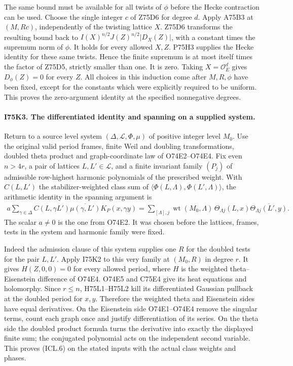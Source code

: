 The same bound must be available for all twists of $\phi$ before
the Hecke contraction can be used. Choose the single integer $c$
of Z75D6 for degree $d$. Apply A75B3 at $(M,Rc)$, independently
of the twisting lattice $X$. Z75D6 transforms the resulting bound
back to $I(X)^{n/2}J(Z)^{n/2}|D_X(Z)|$, with a constant times
the supremum norm of $\phi$. It holds for every allowed $X,Z$.
P75H3 supplies the Hecke identity for these same twists. Hence the
finite supremum is at most itself times the factor of Z75D5,
strictly smaller than one. It is zero. Taking $X=\mathcal O_E^d$
gives $D_\phi(Z)=0$ for every $Z$. All choices in this induction
come after $M,R,\phi$ have been fixed, except for the constants
which were explicitly required to be uniform. This proves the
zero-argument identity at the specified nonnegative degrees.

\paragraph{I75K3. The differentiated identity and spanning on a supplied system.}
Return to a source level system $(\Delta,\mathcal L,\Phi,\mu)$
of positive integer level $M_0$. Use the original valid period
frames, finite Weil and doubling transformations, doubled theta
product and graph-coordinate law of O74E2--O74E4. Fix even
$n>4r$, a pair of lattices $L,L'\in\mathcal L$, and a finite
invariant family $(P_j)$ of admissible row-highest harmonic
polynomials of the prescribed weight. With $C(L,L')$ the stabilizer-weighted class
sum of $\langle\Phi(L,\Lambda),\Phi(L',\Lambda)\rangle$, the
arithmetic identity in the spanning argument is
\[
\begin{split}
 a\sum_{\gamma\in\Delta} C(L,\gamma L')
       \overline{\mu(\gamma,L')} K_P(x,\gamma y)
    =\sum_{[\Lambda],j}\operatorname{wt}(M_0,\Lambda)\,
      \Theta_{\Lambda j}(L,x)
      \overline{\Theta_{\Lambda j}(L',y)} .
\end{split}
\]
The scalar $a\ne0$ is the one from O74E2. It was chosen before the
lattices, frames, tests in the system and harmonic family were fixed.

Indeed the admission clause of this system supplies one $R$ for the
doubled tests for the pair $L,L'$. Apply I75K2 to this very family
at $(M_0,R)$ in degree $r$. It gives $H(Z,0,0)=0$ for every
allowed period, where $H$ is the weighted theta--Eisenstein
difference of O74E4. O74E5 and C75E4 give its heat equations and
holomorphy. Since $r\le n$, H75L1--H75L2 kill its differentiated
Gaussian pullback at the doubled period for $x,y$. Therefore the
weighted theta and Eisenstein sides have equal derivatives.
On the Eisenstein side O74E1--O74E4 remove the singular terms,
count each graph once and justify differentiation of its series.
On the theta side the doubled product formula turns the derivative
into exactly the displayed finite sum; the conjugated polynomial
acts on the independent second variable. This proves (ICL.6) on
the stated inputs with the actual class weights and phases.

